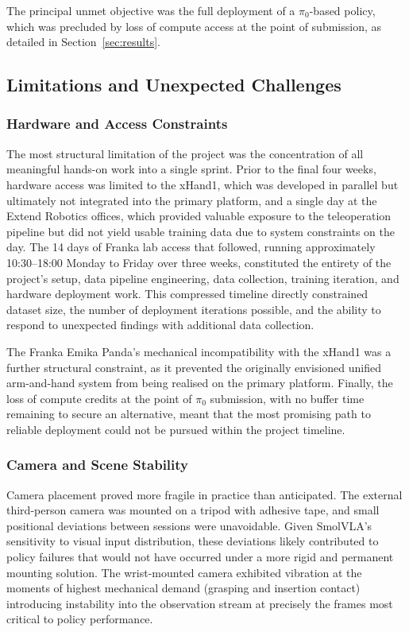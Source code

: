 \documentclass[conference]{IEEEtran}
\begin{document}
The principal unmet objective was the full deployment of a $\pi_0$-based policy, which was precluded by loss of compute access at the point of submission, as detailed in Section~\ref{sec:results}.

\subsection{Limitations and Unexpected Challenges}

\subsubsection{Hardware and Access Constraints}

The most structural limitation of the project was the concentration of all meaningful hands-on work into a single sprint. Prior to the final four weeks, hardware access was limited to the xHand1, which was developed in parallel but ultimately not integrated into the primary platform, and a single day at the Extend Robotics offices, which provided valuable exposure to the teleoperation pipeline but did not yield usable training data due to system constraints on the day. The 14 days of Franka lab access that followed, running approximately 10:30--18:00 Monday to Friday over three weeks, constituted the entirety of the project's setup, data pipeline engineering, data collection, training iteration, and hardware deployment work. This compressed timeline directly constrained dataset size, the number of deployment iterations possible, and the ability to respond to unexpected findings with additional data collection.

The Franka Emika Panda's mechanical incompatibility with the xHand1 was a further structural constraint, as it prevented the originally envisioned unified arm-and-hand system from being realised on the primary platform. Finally, the loss of compute credits at the point of $\pi_0$ submission, with no buffer time remaining to secure an alternative, meant that the most promising path to reliable deployment could not be pursued within the project timeline.

\subsubsection{Camera and Scene Stability}

Camera placement proved more fragile in practice than anticipated. The external third-person camera was mounted on a tripod with adhesive tape, and small positional deviations between sessions were unavoidable. Given SmolVLA's sensitivity to visual input distribution, these deviations likely contributed to policy failures that would not have occurred under a more rigid and permanent mounting solution. The wrist-mounted camera exhibited vibration at the moments of highest mechanical demand (grasping and 
insertion contact) introducing instability into the observation stream at precisely the frames most critical to policy performance.
\end{document}
